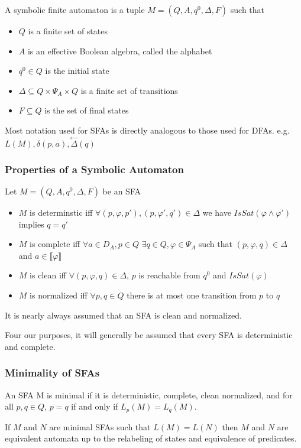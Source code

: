 \documentclass[12pt]{beamer}
\newcommand{\denotation}[1]{\llbracket #1 \rrbracket}
\begin{document}
\begin{frame}
\begin{definition}
A \alert{symbolic finite automaton} is a tuple $M=(Q, A, q^0, \Delta, F)$ such that
\begin{itemize}
\item $Q$ is a finite set of states
\item $A$ is an effective Boolean algebra, called the alphabet
\item $q^0 \in Q$ is the initial state
\item $\Delta \subseteq Q \times \Psi_A \times Q$ is a finite set of transitions
\item $F \subseteq Q$ is the set of final states
\end{itemize}
\end{definition}
Most notation used for SFAs is directly analogous to those used for DFAs. e.g. $L(M),\delta(p,a), \overset{\leftarrow}{\Delta}(q)$ 
\end{frame} 

\begin{frame}
\frametitle{Properties of a Symbolic Automaton}
Let $M=(Q, A, q^0, \Delta, F)$ be an SFA
\begin{itemize}
\item $M$ is \alert{determinstic} iff $\forall (p, \varphi, p'), (p, \varphi', q') \in \Delta$ we have $IsSat(\varphi \wedge \varphi')$ implies $q = q'$
\item $M$ is \alert{complete} iff $\forall a \in D_A, p \in Q$ $\exists q \in Q, \varphi \in \Psi_A$ such that $(p, \varphi, q) \in \Delta$ and $a \in \denotation{\varphi}$
\item $M$ is \alert{clean} iff $\forall (p, \varphi, q) \in \Delta$, $p$ is reachable from $q^0$ and $IsSat(\varphi)$
\item $M$ is \alert{normalized} iff $\forall p,q \in Q$ there is at most one transition from $p$ to $q$
\end{itemize}
It is nearly always assumed that an SFA is clean and normalized.

Four our purposes, it will generally be assumed that every SFA is deterministic and complete.
\end{frame}

\begin{frame}
\frametitle{Minimality of SFAs}
\begin{definition}
An SFA M is \alert{minimal} if it is deterministic, complete, clean normalized, and for all $p,q \in Q$, $p=q$ if and only if $L_p(M) = L_q (M)$.
\end{definition}

\begin{theorem}
If $M$ and $N$ are minimal SFAs such that $L(M) = L(N)$ then $M$ and $N$ are equivalent automata up to the relabeling of states and equivalence of predicates.
\end{theorem}

\end{frame}
\end{document}
